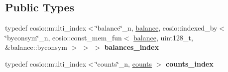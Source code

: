\subsection*{Public Types}
\begin{DoxyCompactItemize}
\item 
\mbox{\label{classp2p_a562223292a6b99a97d486136b2eb0d9e}} 
typedef eosio\+::multi\+\_\+index$<$\char`\"{}balance\char`\"{}\+\_\+n, \mbox{\hyperlink{structp2p_1_1balance}{balance}}, eosio\+::indexed\+\_\+by$<$ \char`\"{}byconsym\char`\"{}\+\_\+n, eosio\+::const\+\_\+mem\+\_\+fun$<$ \mbox{\hyperlink{structp2p_1_1balance}{balance}}, uint128\+\_\+t, \&balance\+::byconsym $>$ $>$ $>$ {\bfseries balances\+\_\+index}
\item 
\mbox{\label{classp2p_a6bef060ed784c193c2a60b397c869c29}} 
typedef eosio\+::multi\+\_\+index$<$\char`\"{}counts\char`\"{}\+\_\+n, \mbox{\hyperlink{structp2p_1_1counts}{counts}} $>$ {\bfseries counts\+\_\+index}
\item 
\mbox{\label{classp2p_af7e337013ebdcc44b420a6d55d0d385f}} 

\end{DoxyCompactItemize}
